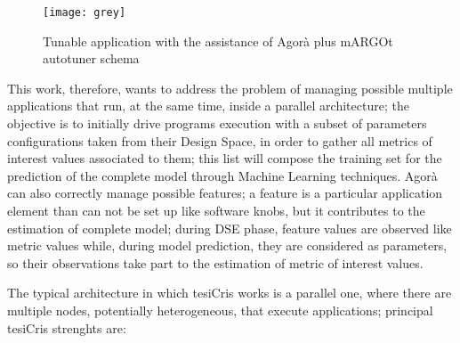 \begin{figure}[H]

    \centering
    \texttt{[image: grey]}
    \caption{Tunable application with the assistance of Agorà plus mARGOt autotuner schema}
    \label{fig::appAGORA}
    
\end{figure}

This work, therefore, wants to address the problem of managing possible multiple applications that run, at the same time, inside a parallel architecture; the objective is to initially drive programs execution with a subset of parameters configurations taken from their Design Space, in order to gather all metrics of interest values associated to them; this list will compose the training set for the prediction of the complete model through Machine Learning techniques. Agorà can also correctly manage possible features; a feature is a particular application element than can not be set up like software knobs, but it contributes to the estimation of complete model; during DSE phase, feature values are observed like metric values while, during model prediction, they are considered as parameters, so their observations take part to the estimation of metric of interest values.

The typical architecture in which tesiCris works is a parallel one, where there are multiple nodes, potentially heterogeneous, that execute applications; principal tesiCris strenghts are:

